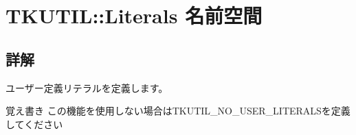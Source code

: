 \hypertarget{namespace_t_k_u_t_i_l_1_1_literals}{}\section{T\+K\+U\+T\+IL\+:\+:Literals 名前空間}
\label{namespace_t_k_u_t_i_l_1_1_literals}


\subsection{詳解}
ユーザー定義リテラルを定義します。

\begin{DoxyNote}{覚え書き}
この機能を使用しない場合は\+T\+K\+U\+T\+I\+L\+\_\+\+N\+O\+\_\+\+U\+S\+E\+R\+\_\+\+L\+I\+T\+E\+R\+A\+L\+Sを定義してください 
\end{DoxyNote}
